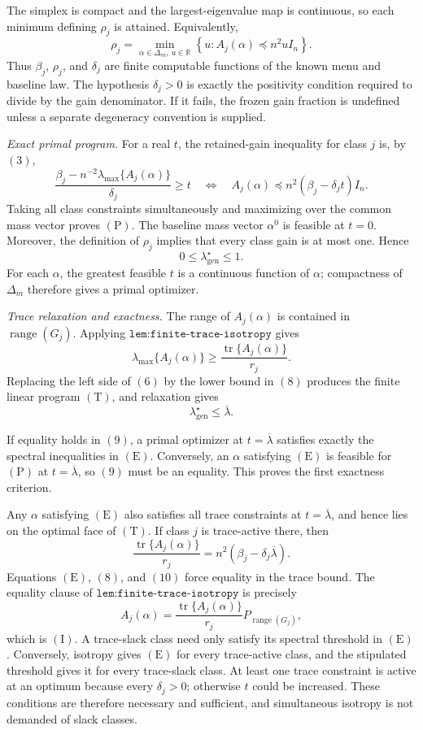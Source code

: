 The simplex is compact and the largest-eigenvalue map is continuous, so each minimum defining \(\rho_j\) is attained. Equivalently,
\[
\rho_j=\min_{\alpha\in\Delta_m,\ u\in\mathbb R}
\left\{u:A_j(\alpha)\preceq n^2uI_n\right\}.
\tag{5}
\]
Thus \(\beta_j\), \(\rho_j\), and \(\delta_j\) are finite computable functions of the known menu and baseline law. The hypothesis \(\delta_j>0\) is exactly the positivity condition required to divide by the gain denominator. If it fails, the frozen gain fraction is undefined unless a separate degeneracy convention is supplied.

\textit{Exact primal program.}
For a real \(t\), the retained-gain inequality for class \(j\) is, by \((3)\),
\[
\frac{\beta_j-n^{-2}\lambda_{\max}\{A_j(\alpha)\}}{\delta_j}\ge t
\quad\Longleftrightarrow\quad
A_j(\alpha)\preceq n^2(\beta_j-\delta_jt)I_n.
\tag{6}
\]
Taking all class constraints simultaneously and maximizing over the common mass vector proves \((\mathrm P)\). The baseline mass vector \(\alpha^0\) is feasible at \(t=0\). Moreover, the definition of \(\rho_j\) implies that every class gain is at most one. Hence
\[
0\le\lambda_{\mathrm{gen}}^\star\le1.
\tag{7}
\]
For each \(\alpha\), the greatest feasible \(t\) is a continuous function of \(\alpha\); compactness of \(\Delta_m\) therefore gives a primal optimizer.

\textit{Trace relaxation and exactness.}
The range of \(A_j(\alpha)\) is contained in \(\operatorname{range}(G_j)\). Applying \(\texttt{lem:finite-trace-isotropy}\) gives
\[
\lambda_{\max}\{A_j(\alpha)\}
\ge \frac{\operatorname{tr}\{A_j(\alpha)\}}{r_j}.
\tag{8}
\]
Replacing the left side of \((6)\) by the lower bound in \((8)\) produces the finite linear program \((\mathrm T)\), and relaxation gives
\[
\lambda_{\mathrm{gen}}^\star\le\overline\lambda.
\tag{9}
\]

If equality holds in \((9)\), a primal optimizer at \(t=\overline\lambda\) satisfies exactly the spectral inequalities in \((\mathrm E)\). Conversely, an \(\alpha\) satisfying \((\mathrm E)\) is feasible for \((\mathrm P)\) at \(t=\overline\lambda\), so \((9)\) must be an equality. This proves the first exactness criterion.

Any \(\alpha\) satisfying \((\mathrm E)\) also satisfies all trace constraints at \(t=\overline\lambda\), and hence lies on the optimal face of \((\mathrm T)\). If class \(j\) is trace-active there, then
\[
\frac{\operatorname{tr}\{A_j(\alpha)\}}{r_j}
=n^2(\beta_j-\delta_j\overline\lambda).
\tag{10}
\]
Equations \((\mathrm E)\), \((8)\), and \((10)\) force equality in the trace bound. The equality clause of \(\texttt{lem:finite-trace-isotropy}\) is precisely
\[
A_j(\alpha)
=\frac{\operatorname{tr}\{A_j(\alpha)\}}{r_j}
P_{\operatorname{range}(G_j)},
\]
which is \((\mathrm I)\). A trace-slack class need only satisfy its spectral threshold in \((\mathrm E)\). Conversely, isotropy gives \((\mathrm E)\) for every trace-active class, and the stipulated threshold gives it for every trace-slack class. At least one trace constraint is active at an optimum because every \(\delta_j>0\); otherwise \(t\) could be increased. These conditions are therefore necessary and sufficient, and simultaneous isotropy is not demanded of slack classes.

